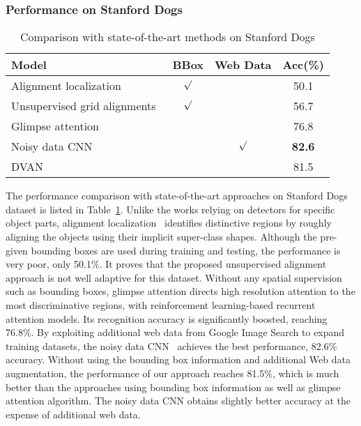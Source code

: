 \documentclass[journal]{IEEEtran}
\begin{document}
\subsubsection{Performance on Stanford Dogs}
\begin{table}[!t]
  \centering
  \caption{Comparison with state-of-the-art methods on Stanford Dogs}
  \vspace{-0.1in}
  \label{tab:comparison_dogs_2}
  \begin{tabular}{lccc}
    \hline\hline
    Model & BBox & Web Data & Acc(\%)\\
    \hline
    Alignment localization \cite{alignment} & $\surd$ &   & 50.1\\
    Unsupervised grid alignments~\cite{Gavves2015}  & $\surd$ &   & 56.7\\
    Glimpse attention~\cite{attention_categorization} & & & 76.8\\
    Noisy data CNN~\cite{noisy}&& $\surd$  & \textbf{82.6}\\
    DVAN                       & & & 81.5\\
    \hline\hline
  \end{tabular}
  \vspace{-0.2in}
\end{table}
The performance comparison with state-of-the-art approaches on Stanford Dogs dataset is listed in Table~\ref{tab:comparison_dogs_2}. Unlike the works relying on detectors for specific object parts, alignment localization~\cite{alignment} identifies distinctive regions by roughly aligning the objects using their implicit super-class shapes. Although the pre-given bounding boxes are used during training and testing, the performance is very poor, only 50.1\%. It proves that the proposed unsupervised alignment approach is not well adaptive for this dataset. Without any spatial supervision such as bounding boxes, glimpse attention \cite{attention_categorization} directs high resolution attention to the most discriminative regions, with reinforcement learning-based recurrent attention models. Its recognition accuracy is significantly boosted, reaching 76.8\%. By exploiting additional web data from Google Image Search to expand training datasets, the noisy data CNN~\cite{noisy} achieves the best performance, 82.6\% accuracy. Without using the bounding box information and additional Web data augmentation, the performance of our approach reaches 81.5\%, which is much better than the approaches using bounding box information as well as glimpse attention algorithm. The noisy data CNN obtains slightly better accuracy at the expense of additional web data.
\end{document}
